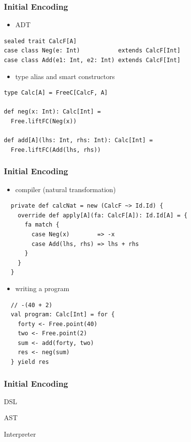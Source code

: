 \documentclass{beamer}
\begin{document}
\begin{frame}
  \frametitle{Initial Encoding}
  \begin{itemize}
  \item ADT
  \end{itemize}
\begin{verbatim}
sealed trait CalcF[A]
case class Neg(e: Int)           extends CalcF[Int]
case class Add(e1: Int, e2: Int) extends CalcF[Int]
\end{verbatim}
  \begin{itemize}
  \item type alias and smart constructors
  \end{itemize}
\begin{verbatim}
type Calc[A] = FreeC[CalcF, A]

def neg(x: Int): Calc[Int] =
  Free.liftFC(Neg(x))

def add[A](lhs: Int, rhs: Int): Calc[Int] =
  Free.liftFC(Add(lhs, rhs))
\end{verbatim}
\end{frame}
\begin{frame}
  \frametitle{Initial Encoding}
  \begin{itemize}
  \item compiler (natural transformation)
  \end{itemize}
\begin{verbatim}
  private def calcNat = new (CalcF ~> Id.Id) {
    override def apply[A](fa: CalcF[A]): Id.Id[A] = {
      fa match {
        case Neg(x)        => -x
        case Add(lhs, rhs) => lhs + rhs
      }
    }
  }
\end{verbatim}
  \begin{itemize}
  \item writing a program
  \end{itemize}
\begin{verbatim}
  // -(40 + 2)
  val program: Calc[Int] = for {
    forty <- Free.point(40)
    two <- Free.point(2)
    sum <- add(forty, two)
    res <- neg(sum)
  } yield res
\end{verbatim}
\end{frame}

\begin{frame}
  \frametitle{Initial Encoding}
  \begin{center}
    \Huge
    DSL
  \end{center}
  \begin{center}
    \Huge
    AST
  \end{center}
  \begin{center}
    \Huge
    Interpreter
  \end{center}
\end{frame}
\end{document}
